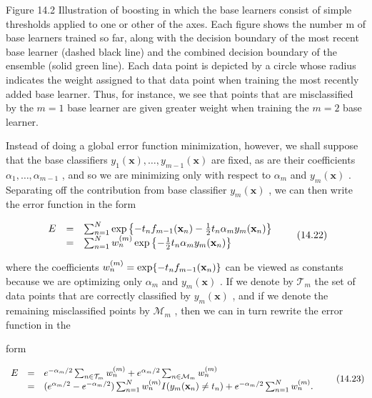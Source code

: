 \documentclass[
  10
]{article}
\begin{document}
Figure 14.2 Illustration of boosting in which the base learners consist
of simple thresholds applied to one or other of the axes. Each figure
shows the number m of base learners trained so far, along with the
decision boundary of the most recent base learner (dashed black line)
and the combined decision boundary of the ensemble (solid green line).
Each data point is depicted by a circle whose radius indicates the
weight assigned to that data point when training the most recently added
base learner. Thus, for instance, we see that points that are
misclassified by the \(m = 1\) base learner are given greater weight
when training the \(m = 2\) base learner.

Instead of doing a global error function minimization, however, we shall
suppose that the base classifiers
\(y _ { 1 } ( \mathbf x ) , \dots , y _ { m - 1 } ( \mathbf x )\) are
fixed, as are their coefficients
\(\alpha _ { 1 } , \ldots , \alpha _ { m - 1 }\) , and so we are
minimizing only with respect to \(\alpha _ { m }\) and
\(y _ { m } ( \mathbf { x } )\) . Separating off the contribution from
base classifier \(y _ { m } ( \mathbf x )\) , we can then write the
error function in the form

\[
\begin{array}{r c l} {E} & {=} & { \sum_ {n = 1} ^ {N} \exp \left\{- t _ {n} f _ {m - 1} (\mathbf {x} _ {n}) - \frac {1}{2} t _ {n} \alpha_ {m} y _ {m} (\mathbf {x} _ {n}) \right\}} \\ & {=} & { \sum_ {n = 1} ^ {N} w _ {n} ^ {(m)} \exp \left\{- \frac {1}{2} t _ {n} \alpha_ {m} y _ {m} (\mathbf {x} _ {n}) \right\}} \end{array}\tag{14.22}
\]

where the coefficients
\(w _ { n } ^ { ( m ) } = \exp \{ - t _ { n } f _ { m - 1 } ( { \bf x } _ { n } ) \}\)
can be viewed as constants because we are optimizing only
\(\alpha _ { m }\) and \(y _ { m } ( \mathbf x )\) . If we denote by
\(\mathcal { T } _ { m }\) the set of data points that are correctly
classified by \(y _ { m } ( \mathbf { x } )\) , and if we denote the
remaining misclassified points by \(\mathcal { M } _ { m }\) , then we
can in turn rewrite the error function in the

form

\[
\begin{array}{r c l} E & = & e ^ {- \alpha_ {m} / 2} \sum_ {n \in \mathcal {T} _ {m}} w _ {n} ^ {(m)} + e ^ {\alpha_ {m} / 2} \sum_ {n \in \mathcal {M} _ {m}} w _ {n} ^ {(m)} \\ & = & (e ^ {\alpha_ {m} / 2} - e ^ {- \alpha_ {m} / 2}) \sum_ {n = 1} ^ {N} w _ {n} ^ {(m)} I (y _ {m} (\mathbf {x} _ {n}) \neq t _ {n}) + e ^ {- \alpha_ {m} / 2} \sum_ {n = 1} ^ {N} w _ {n} ^ {(m)}. \end{array}\tag{14.23}
\]
\end{document}
